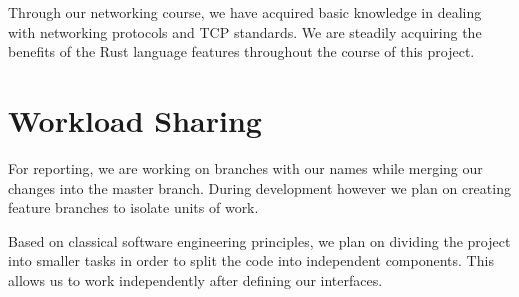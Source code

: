 \documentclass[a4paper, 11pt]{article}
\begin{document}
Through our networking course, we have acquired basic knowledge in dealing with networking protocols and TCP standards. We are steadily acquiring the benefits of the Rust language features throughout the course of this project.


\section*{Workload Sharing}
For reporting, we are working on branches with our names while merging our changes into the master branch. During development however we plan on creating feature branches to isolate units of work. 

Based on classical software engineering principles, we plan on dividing the project into smaller tasks in order to split the code into independent components. This allows us to work independently after defining our interfaces. 





\end{document}
